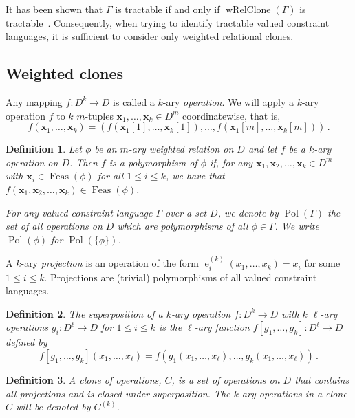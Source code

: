 \documentclass[11pt, reqno]{article}
\DeclareMathOperator{\proj}{\ensuremath{e}}
\newcommand{\tup}[1]{\ensuremath{\mathbf #1}}
\DeclareMathOperator{\dom}{{Feas}}
\DeclareMathOperator{\pol}{Pol}
\DeclareMathOperator{\wrelclone}{wRelClone}
\newtheorem{definition}{Definition}
\theoremstyle{remark}
\begin{document}
It has been shown that $\Gamma$ is tractable if and only if $\wrelclone(\Gamma)$
is tractable~\cite{cccjz13:sicomp}. Consequently, when trying to identify
tractable valued constraint languages, it is sufficient to consider only
weighted relational clones. 

\subsection{Weighted clones}

Any mapping $f:D^k\rightarrow D$ is called a $k$-ary \emph{operation}. We will
apply a $k$-ary operation $f$ to $k$ $m$-tuples $\tup{x_1},\ldots,\tup{x_k}\in
D^m$ coordinatewise, that is, 
\begin{equation}
f(\tup{x_1},\ldots,\tup{x_k})=(f(\tup{x_1}[1],\ldots,\tup{x_k}[1]),\ldots,f(\tup{x_1}[m],\ldots,\tup{x_k}[m]))\,.
\end{equation}
%
\begin{definition} \label{def:pol}
%
Let $\phi$ be an $m$-ary weighted relation on $D$ and let $f$ be a $k$-ary operation
on $D$.
Then $f$ is a \emph{polymorphism} of $\phi$ if,
for any $\tup{x_1},\tup{x_2},\ldots,\tup{x_k} \in D^m$ with
$\tup{x_i}\in\dom(\phi)$ for all $1\leq i\leq k$,
we have that $f(\tup{x_1},\tup{x_2},\ldots,\tup{x_k})\in\dom(\phi)$.

For any valued constraint language $\Gamma$ over a set $D$,
we denote by $\pol(\Gamma)$ the set of all operations on $D$ which are polymorphisms of all 
$\phi \in \Gamma$. We write $\pol(\phi)$ for $\pol(\{\phi\})$.
\end{definition}
%
A $k$-ary \emph{projection} is an operation of the form
$\proj^{(k)}_i(x_1,\ldots,x_k)=x_i$ for some $1\leq i\leq k$.
%
Projections are (trivial) polymorphisms of all valued constraint languages.

\begin{definition}
The \emph{superposition} of a $k$-ary operation $f:D^k\rightarrow D$ with $k$
$\ell$-ary operations $g_i:D^\ell\rightarrow D$ for $1\leq i\leq k$ is the
$\ell$-ary function $f[g_1,\ldots,g_k]:D^\ell\to D$ defined by
\begin{equation}
f[g_1,\ldots,g_k](x_1,\ldots,x_\ell)=f(g_1(x_1,\ldots,x_\ell),\ldots,g_k(x_1,\ldots,x_\ell))\,.
\end{equation}
\end{definition}

\begin{definition}\label{def:clone}
A \emph{clone} of operations, $C$, is a set of operations on $D$
that contains all projections and is closed under superposition.
%
The $k$-ary operations in a clone $C$ will be denoted by $C^{(k)}$.
\end{definition}
\end{document}
